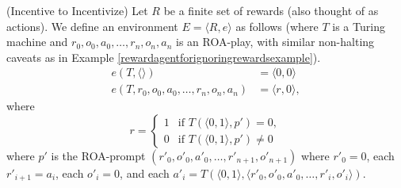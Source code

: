 \documentclass[runningheads]{llncs}
\begin{document}
\begin{example}
\label{incentivetoincentivizeexample}
    (Incentive to Incentivize)
    Let $R$ be a finite set of rewards (also thought of as actions).
    We define an environment $E=\langle R,e\rangle$ as follows
    (where $T$ is a Turing machine and $r_0,o_0,a_0,\ldots,r_n,o_n,a_n$
    is an ROA-play,
    with similar non-halting caveats as in
    Example \ref{rewardagentforignoringrewardsexample}).
    \begin{align*}
        e(T,\langle\rangle) &= \langle 0, 0\rangle\\
        e(T,r_0,o_0,a_0,\ldots,r_n,o_n,a_n) &= \langle r, 0\rangle,
    \end{align*}
    where
    \[
        r =
        \begin{cases}
            1 & \mbox{if $T(\langle 0,1\rangle,p')=0$},\\
            0 & \mbox{if $T(\langle 0,1\rangle,p')\not=0$}
        \end{cases}
    \]
    where $p'$ is the ROA-prompt $(r'_0,o'_0,a'_0,\ldots,r'_{n+1},o'_{n+1})$
    where $r'_0=0$, each $r'_{i+1}=a_i$,
    each $o'_i=0$, and each
    $a'_i=T(\langle 0,1\rangle, \langle r'_0,o'_0,a'_0,\ldots,r'_i,o'_i\rangle)$.
\end{example}
\end{document}
